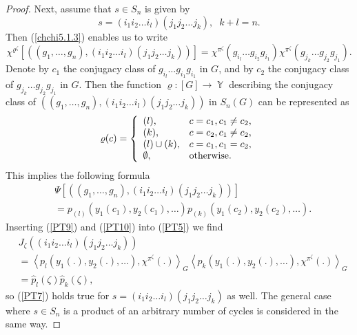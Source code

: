 \documentclass[10pt,a4paper]{amsart}
\DeclareMathOperator{\Y}{\mathbb{Y}}
\begin{document}
\begin{proof}
Next, assume that $s\in S_n$ is given by
$$
s=(i_1i_2\ldots i_l)(j_1j_2\ldots j_k),\;\; k+l=n.
$$
Then (\ref{chchi5.1.3}) enables us to write
\begin{equation}\label{PT9}
\chi^{\varrho^{\zeta}}\left[\left((g_1,\ldots,g_n),(i_1i_2\ldots i_l)(j_1j_2\ldots j_k)\right)\right]=
\chi^{\pi^{\zeta}}(g_{i_l}\ldots g_{i_2}g_{i_1})\chi^{\pi^{\zeta}}(g_{j_k}\ldots g_{j_2}g_{j_1}).
\end{equation}
Denote by $c_1$ the conjugacy class of $g_{i_l}\ldots g_{i_1}g_{i_1}$ in $G$, and
by $c_2$ the conjugacy class of $g_{j_k}\ldots g_{j_2}g_{j_1}$ in $G$. Then the function
$\varrho: [G]\rightarrow \Y$ describing the conjugacy class of
$\left((g_1,\ldots,g_n), (i_1i_2\ldots i_l)(j_1j_2\ldots j_k)\right)$ in $S_n(G)$
can be represented as
$$
\varrho(c)=\left\{
  \begin{array}{ll}
    (l), & c=c_1, c_1\neq c_2, \\
    (k), & c=c_2,c_1\neq c_2, \\
    (l)\cup (k), & c=c_1, c_1=c_2, \\
    \emptyset, & \hbox{otherwise.}
  \end{array}
\right.
$$
This implies the following formula
\begin{equation}\label{PT10}
\begin{split}
&\Psi\left[\left((g_1,\ldots,g_n),(i_1i_2\ldots i_l)(j_1j_2\ldots j_k)\right)\right]\\
&=p_{(l)}\left(y_1(c_1),y_2(c_1),\ldots\right)p_{(k)}\left(y_1(c_2),y_2(c_2),\ldots\right).
\end{split}
\end{equation}
Inserting (\ref{PT9}) and (\ref{PT10}) into (\ref{PT5}) we find
\begin{equation}
\begin{split}
&J_{\zeta}\left((i_1i_2\ldots i_l)(j_1j_2\ldots j_k)\right)\\
&=\left<p_l\left(y_1(.),y_2(.),\ldots\right),
\chi^{\pi^{\zeta}}(.)\right>_{G}\left<p_k\left(y_1(.),y_2(.),\ldots\right),
\chi^{\pi^{\zeta}}(.)\right>_{G}\\
&=\widehat{p}_l(\zeta)\widehat{p}_k(\zeta),
\end{split}
\end{equation}
so (\ref{PT7}) holds true for $s=(i_1i_2\ldots i_l)(j_1j_2\ldots j_k)$ as well. The general case where
$s\in S_n$ is a product of an arbitrary number of cycles is considered in the same way.
\end{proof}
\end{document}
